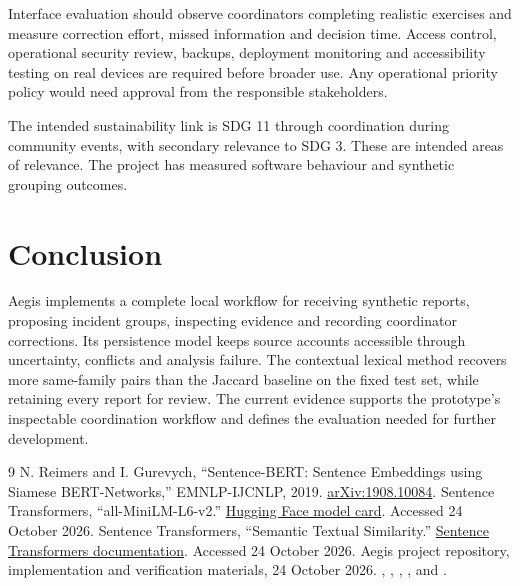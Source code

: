 \documentclass[11pt,a4paper]{article}
\begin{document}
Interface evaluation should observe coordinators completing realistic exercises and measure correction effort, missed information and decision time. Access control, operational security review, backups, deployment monitoring and accessibility testing on real devices are required before broader use. Any operational priority policy would need approval from the responsible stakeholders.

The intended sustainability link is SDG 11 through coordination during community events, with secondary relevance to SDG 3. These are intended areas of relevance. The project has measured software behaviour and synthetic grouping outcomes.

\section{Conclusion}
Aegis implements a complete local workflow for receiving synthetic reports, proposing incident groups, inspecting evidence and recording coordinator corrections. Its persistence model keeps source accounts accessible through uncertainty, conflicts and analysis failure. The contextual lexical method recovers more same-family pairs than the Jaccard baseline on the fixed test set, while retaining every report for review. The current evidence supports the prototype's inspectable coordination workflow and defines the evaluation needed for further development.

\begingroup\small\raggedright
\begin{thebibliography}{9}
 N. Reimers and I. Gurevych, ``Sentence-BERT: Sentence Embeddings using Siamese BERT-Networks,'' EMNLP-IJCNLP, 2019. \href{https://arxiv.org/abs/1908.10084}{arXiv:1908.10084}.
 Sentence Transformers, ``all-MiniLM-L6-v2.'' \href{https://huggingface.co/sentence-transformers/all-MiniLM-L6-v2}{Hugging Face model card}. Accessed 24 October 2026.
 Sentence Transformers, ``Semantic Textual Similarity.'' \href{https://sbert.net/docs/sentence_transformer/usage/semantic_textual_similarity.html}{Sentence Transformers documentation}. Accessed 24 October 2026.
 Aegis project repository, implementation and verification materials, 24 October 2026. , , , ,  and .
\end{thebibliography}
\endgroup
\end{document}
